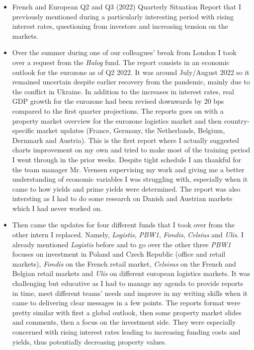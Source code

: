 \begin{itemize}
    \item French and European Q2 and Q3 (2022) Quarterly Situation Report that I previously mentioned during a particularly interesting period with rising interest rates, questioning from investors and increasing tension on the markets.
    \item Over the summer during one of our colleagues’ break from London I took over a request from the \textit{Halog} fund. The report consists in an economic outlook for the eurozone as of Q2 2022. It was around July/August 2022 so it remained uncertain despite earlier recovery from the pandemic, mainly due to the conflict in Ukraine. In addition to the increases in interest rates, real GDP growth for the eurozone had been revised downwards by 20 bps compared to the first quarter projections. The reports goes on with a property market overview for the eurozone logistics market and then country-specific market updates (France, Germany, the Netherlands, Belgium, Dernmark and Austria). This is the first report where I actually suggested charts improvement on my own and tried to make most of the training period I went through in the prior weeks. Despite tight schedule I am thankful for the team manager Mr. Vrensen supervising my work and giving me a better understanding of economic variables I was struggling with, especially when it came to how yields and prime yields were determined. The report was also intersting as I had to do some research on Danish and Austrian markets which I had never worked on. 
    \item Then came the updates for four different funds that I took over from the other intern I replaced. Namely, \textit{Logistis}, \textit{PBW1}, \textit{Fondis}, \textit{Celsius} and \textit{Ulis}. I already mentioned \textit{Logistis} before and to go over the other three \textit{PBW1} focuses on investment in Poland and Czech Republic (office and retail markets), \textit{Fondis} on the French retail market, \textit{Celsisus} on the French and Belgian retail markets and \textit{Ulis} on different european logistics markets. It was challenging but educative as I had to manage my agenda to provide reports in time, meet different teams’ needs and improve in my writing skills when it came to delivering clear messages in a few points. The reports format were pretty similar with first a global outlook, then some property market slides and comments, then a focus on the investment side. They were especially concerned with rising interest rates leading to increasing funding costs and yields, thus potentially decreasing property  values.

\end{itemize}
